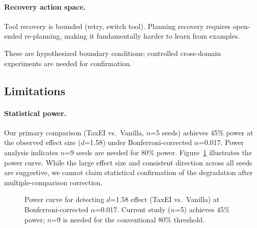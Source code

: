 \documentclass[11pt]{article}
\begin{document}
\paragraph{Recovery action space.} Tool recovery is bounded (retry, switch tool). Planning recovery requires open-ended re-planning, making it fundamentally harder to learn from examples.

These are hypothesized boundary conditions; controlled cross-domain experiments are needed for confirmation.

\subsection{Limitations}
\label{sec:limitations}

\paragraph{Statistical power.}
Our primary comparison (TaxEI vs.\ Vanilla, $n$=5 seeds) achieves 45\% power at the observed effect size ($d$=1.58) under Bonferroni-corrected $\alpha$=0.017.
Power analysis indicates $n$=9 seeds are needed for 80\% power.
Figure~\ref{fig:power} illustrates the power curve.
While the large effect size and consistent direction across all seeds are suggestive, we cannot claim statistical confirmation of the degradation after multiple-comparison correction.

\begin{figure}[t]
\centering
{}
\caption{Power curve for detecting $d$=1.58 effect (TaxEI vs.\ Vanilla) at Bonferroni-corrected $\alpha$=0.017. Current study ($n$=5) achieves 45\% power; $n$=9 is needed for the conventional 80\% threshold.}
\label{fig:power}
\end{figure}
\end{document}
